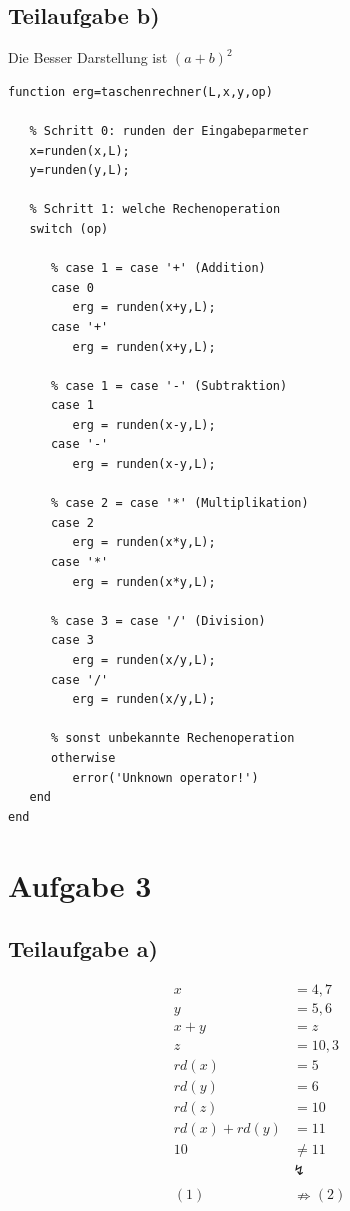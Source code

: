 \documentclass{llncs}
\begin{document}
\subsection*{Teilaufgabe b)}
Die Besser Darstellung ist $(a+b)^2$
\begin{verbatim}
function erg=taschenrechner(L,x,y,op)
   
   % Schritt 0: runden der Eingabeparmeter
   x=runden(x,L);
   y=runden(y,L);
	
   % Schritt 1: welche Rechenoperation
   switch (op)
      
      % case 1 = case '+' (Addition)
      case 0
         erg = runden(x+y,L);
      case '+'
         erg = runden(x+y,L);

      % case 1 = case '-' (Subtraktion)
      case 1
         erg = runden(x-y,L);
      case '-'
         erg = runden(x-y,L);
		
      % case 2 = case '*' (Multiplikation)
      case 2
         erg = runden(x*y,L);
      case '*'
         erg = runden(x*y,L);

      % case 3 = case '/' (Division)
      case 3	
         erg = runden(x/y,L);
      case '/'	
         erg = runden(x/y,L);
		
      % sonst unbekannte Rechenoperation
      otherwise
         error('Unknown operator!')
   end
end
\end{verbatim}
\newpage

\section*{Aufgabe 3}

\subsection*{Teilaufgabe a)}

\begin{align*}
x &= 4,7 \\
y &= 5,6 \\
x + y &= z \\
z &= 10,3 \\
rd(x) &= 5 \\
rd(y) &= 6 \\
rd(z) &= 10 \\
rd(x) + rd(y) &= 11 \\
10 &\neq 11 \\
&\lightning\\
\\
(1) &\nRightarrow (2)
\end{align*}
\end{document}
